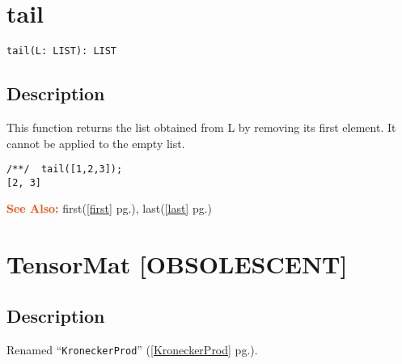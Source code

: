 \documentclass[a4paper]{mybook}
\newenvironment{command}{}{} %
\newcommand\SeeAlso{\par\textcolor{OrangeRed}{\textbf{\large See Also: }}}
\begin{document}
\section{tail}
\label{tail}
\begin{command} %


\begin{Verbatim}[label=syntax, rulecolor=\color{MidnightBlue},
frame=single]
tail(L: LIST): LIST
\end{Verbatim}


\subsection*{Description}

This function returns the list obtained from L by removing its first
element.  It cannot be applied to the empty list.
\begin{Verbatim}[label=example, rulecolor=\color{PineGreen}, frame=single]
/**/  tail([1,2,3]);
[2, 3]
\end{Verbatim}


\SeeAlso %
  first(\ref{first} pg.\pageref{first}), 
    last(\ref{last} pg.\pageref{last})
\end{command} %

\section{TensorMat [OBSOLESCENT]}
\label{TensorMat [OBSOLESCENT]}
\begin{command} %



\subsection*{Description}

Renamed ``\verb&KroneckerProd&'' (\ref{KroneckerProd} pg.\pageref{KroneckerProd}).

\end{command} %
\end{document}
